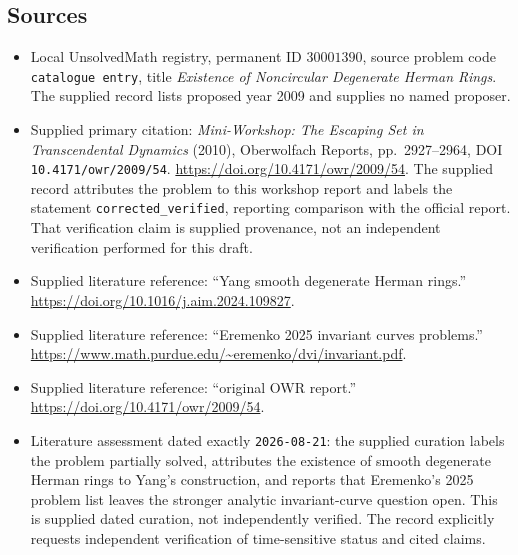 \documentclass[11pt]{article}
\begin{document}
\subsection{Sources}
\begin{itemize}
\item Local UnsolvedMath registry, permanent ID \(30001390\), source problem code \texttt{catalogue entry}, title \emph{Existence of Noncircular Degenerate Herman Rings}. The supplied record lists proposed year 2009 and supplies no named proposer.
\item Supplied primary citation: \emph{Mini-Workshop: The Escaping Set in Transcendental Dynamics} (2010), Oberwolfach Reports, pp.\ 2927--2964, DOI \texttt{10.4171/owr/2009/54}. \url{https://doi.org/10.4171/owr/2009/54}. The supplied record attributes the problem to this workshop report and labels the statement \texttt{corrected\_verified}, reporting comparison with the official report. That verification claim is supplied provenance, not an independent verification performed for this draft.
\item Supplied literature reference: ``Yang smooth degenerate Herman rings.'' \url{https://doi.org/10.1016/j.aim.2024.109827}.
\item Supplied literature reference: ``Eremenko 2025 invariant curves problems.'' \url{https://www.math.purdue.edu/~eremenko/dvi/invariant.pdf}.
\item Supplied literature reference: ``original OWR report.'' \url{https://doi.org/10.4171/owr/2009/54}.
\item Literature assessment dated exactly \texttt{2026-08-21}: the supplied curation labels the problem partially solved, attributes the existence of smooth degenerate Herman rings to Yang's construction, and reports that Eremenko's 2025 problem list leaves the stronger analytic invariant-curve question open. This is supplied dated curation, not independently verified. The record explicitly requests independent verification of time-sensitive status and cited claims.
\end{itemize}
\end{document}

